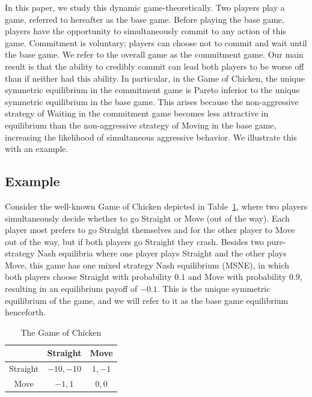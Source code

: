 \documentclass[letterpaper]{article}
\newcommand{\capA}{-10}
\newcommand{\capB}{1}
\newcommand{\capC}{-1}
\newcommand{\capD}{0}
\newcommand{\baseProbStraight}{0.1}
\newcommand{\baseProbMove}{0.9}
\newcommand{\baseMixPayoff}{-0.1}
\theoremstyle{definition}
\begin{document}


In this paper, we study this dynamic game-theoretically. Two players play a game, referred to hereafter as the base game. Before playing the base game, players have the opportunity to simultaneously commit to any action of this game. Commitment is voluntary; players can choose not to commit and wait until the base game. We refer to the overall game as the commitment game. Our main result is that the ability to credibly commit can lead both players to be worse off than if neither had this ability. In particular, in the Game of Chicken, the unique symmetric equilibrium in the commitment game is Pareto inferior to the unique symmetric equilibrium in the base game. This arises because the non-aggressive strategy of Waiting in the commitment game becomes less attractive in equilibrium than the non-aggressive strategy of Moving in the base game, increasing the likelihood of simultaneous aggressive behavior. We illustrate this with an example.

\subsection*{Example}
Consider the well-known Game of Chicken depicted in Table~\ref{tab:gameofchicken}, where two players simultaneously decide whether to go Straight or Move (out of the way). Each player most prefers to go Straight themselves and for the other player to Move out of the way, but if both players go Straight they crash. Besides two pure-strategy Nash equilibria where one player plays Straight and the other plays Move, this game has one mixed strategy Nash equilibrium (MSNE), in which both players choose Straight with probability $\baseProbStraight$ and Move with probability $\baseProbMove$, resulting in an equilibrium payoff of $\baseMixPayoff$. This is the unique symmetric equilibrium of the game, and we will refer to it as the base game equilibrium henceforth.
\begin{table}[!ht]
    \centering
    \begin{tabular}{ccc}
        \toprule
        & Straight & Move \\
        \midrule
            Straight & $\capA,\capA$ & $\capB,\capC$ \\
            Move     & $\capC,\capB$ & $\capD,\capD$ \\
        \bottomrule
    \end{tabular}
    \caption{The Game of Chicken}
    \label{tab:gameofchicken}
\end{table}
\end{document}
